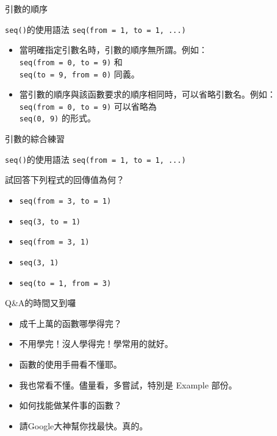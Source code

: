 \documentclass[12pt]{beamer}
\begin{document}
\begin{frame}[fragile]{引數的順序}

\begin{block}{\texttt{seq()}的使用語法}
\verb+seq(from = 1, to = 1, ...)+ \\
\end{block}

\begin{itemize}
\item 當明確指定引數名時，引數的順序無所謂。例如：\\ \verb+seq(from = 0, to = 9)+ 和 \\ \verb+seq(to = 9, from = 0)+ 同義。
\item 當引數的順序與該函數要求的順序相同時，可以省略引數名。例如：\\ \verb+seq(from = 0, to = 9)+ 可以省略為 \\ \verb+seq(0, 9)+ 的形式。
\end{itemize}
\end{frame}


\begin{frame}[fragile]{引數的綜合練習}

\begin{block}{\texttt{seq()}的使用語法}
\verb+seq(from = 1, to = 1, ...)+ \\
\end{block}

試回答下列程式的回傳值為何？
\begin{itemize}
\item \verb+seq(from = 3, to = 1)+
\item \verb+seq(3, to = 1)+
\item \verb+seq(from = 3, 1)+
\item \verb+seq(3, 1)+
\item \verb+seq(to = 1, from = 3)+
\end{itemize}
\end{frame}



\begin{frame}[fragile]{Q\&A的時間又到囉}
\begin{itemize}
\item[Q] 成千上萬的函數哪學得完？
\item[A] 不用學完！沒人學得完！學常用的就好。
\end{itemize}
\begin{itemize}
\item[Q] 函數的使用手冊看不懂耶。
\item[A] 我也常看不懂。儘量看，多嘗試，特別是 Example 部份。
\end{itemize}
\begin{itemize}
\item[Q] 如何找能做某件事的函數？
\item[A] 請Google大神幫你找最快。真的。
\end{itemize}
\end{frame}
\end{document}
